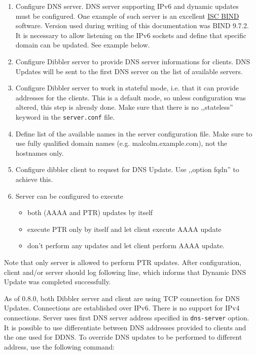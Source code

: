 \begin{enumerate}
\item Configure DNS server. DNS server supporting IPv6 and dynamic
  updates must be configured. One example of such server is an
  excellent \href{http://www.isc.org/software/bind}{ISC BIND}
  software. Version used during writing of this documentation was BIND
  9.7.2. It is necessary to allow listening on the IPv6 sockets and
  define that specific domain can be updated. See example below.
\item Configure Dibbler server to provide DNS server informations for
  clients. DNS Updates will be sent to the first DNS server on the
  list of available servers.
\item Configure Dibbler server to work in stateful mode, i.e. that it
  can provide addresses for the clients. This is a default mode, so
  unless configuration was altered, this step is already done. Make
  sure that there is no ,,stateless'' keyword in the
  \verb+server.conf+ file.
\item Define list of the available names in the server configuration
  file. Make sure to use fully qualified domain names
  (e.g. malcolm.example.com), not the hostnames only.
\item Configure dibbler client to request for DNS Update. Use ,,option
  fqdn'' to achieve this.
\item Server can be configured to execute
      \begin{itemize}
       \item both (AAAA and PTR) updates by itself
       \item execute PTR only by itself and let client execute AAAA
             update
       \item don't perform any updates and let client perform AAAA
             update.
      \end{itemize}
\end{enumerate}

Note that only server is allowed to perform PTR updates. After
configuration, client and/or server should log following line, which
informs that Dynamic DNS Update was completed successfully.

As of 0.8.0, both Dibbler server and client are using TCP connection
for DNS Updates. Connections are established over IPv6. There is no
support for IPv4 connections. Server uses first DNS server address
specified in \verb+dns-server+ option. It is possible to use
differentiate between DNS addresses provided to clients and the one
used for DDNS. To override DNS updates to be performed to different
address, use the following command:

